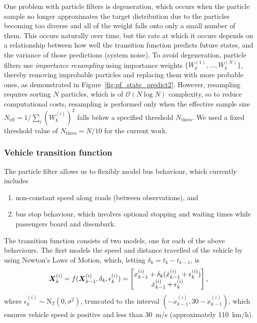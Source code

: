 One problem with particle filters is degeneration,
which occurs when the particle sample no longer approximates the target distribution
due to the particles becoming too diverse
and all of the weight falls onto only a small number of them.
This occurs naturally over time, but the rate at which it occurs depends 
on a relationship between how well the transition function predicts future states,
and the variance of those predictions (system noise).
To avoid degeneration,
particle filters use \emph{importance resampling}
using importance weights $\{W_k^{(1)}, \ldots, W_k^{(N)}\}$,
thereby removing improbable particles and replacing them with more probable ones,
as demonstrated in Figure~\ref{fig:pf_state_predict2}.
However, resampling requires sorting $N$ particles,
which is of $\mathcal{O}(N\log N)$ complexity,
so to reduce computational costs, resampling is performed only when
the effective sample size $N_{\text{eff}} = 1 / \sum_i (W_k^{(i)})^2$
falls below a specified threshold $N_{\text{thres}}$.
We used a fixed threshold value of $N_{\text{thres}} = N/10$
for the current work.


\subsubsection{Vehicle transition function}
\label{sec:pf_prediction}

The particle filter allows us to flexibly model bus behaviour,
which currently includes
\begin{enumerate}
\item non-constant speed along roads (between observations), and
\item bus stop behaviour, which involves optional stopping and waiting times
    while passengers board and disembark.
\end{enumerate}
The transition function consists of two models,
one for each of the above behaviours.
The first models the speed and distance travelled of the vehicle 
by using Newton's Laws of Motion,
which, letting $\delta_k = t_k - t_{k-1}$, is
\begin{equation}
\label{eq:trans_newton}
\mbox{$\boldsymbol{X}$}_k^{(i)} = f(\mbox{$\boldsymbol{X}$}_{k-1}^{(i)}, \delta_k, \epsilon_k^{(i)}) = 
    \begin{bmatrix}
        x_{k-1}^{(i)} + \delta_k(\dot x_{k-1}^{(i)} + \epsilon_k^{(i)}) \\
        \dot x_{k-1}^{(i)} + \epsilon_k^{(i)}
    \end{bmatrix},
\end{equation}
where $\epsilon_k^{(i)}\sim\mathrm{N}_T(0, \sigma^2)$, truncated to the interval
$(-\dot x_{k-1}^{(i)}, 30 - \dot x_{k-1}^{(i)})$,
which ensures vehicle speed is positive and less than 30~m/s
(approximately 110~km/h).


